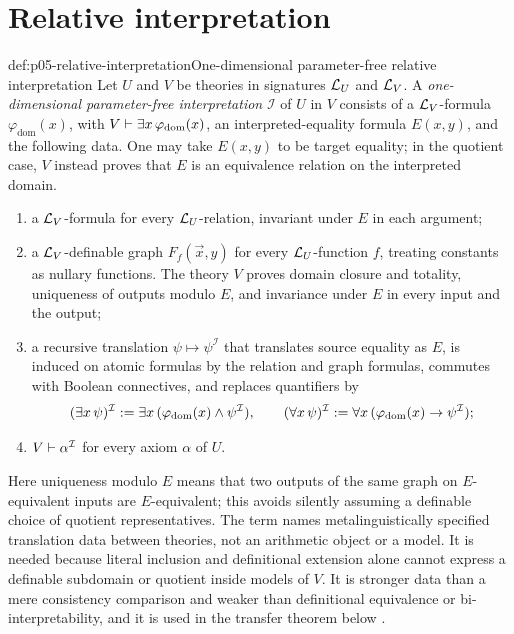 \section{Relative interpretation}

\begin{hbdefinition}{def:p05-relative-interpretation}{One-dimensional parameter-free relative interpretation}
Let \(U\) and \(V\) be theories in signatures \(\mathcal{L}_U\) and
\(\mathcal{L}_V\).  A \emph{one-dimensional parameter-free interpretation}
\(\mathcal I\) of \(U\) in \(V\) consists of a \(\mathcal{L}_V\)-formula
\(\varphi_{\mathrm{dom}}(x)\), with
\(V\vdash\exists x\,\varphi_{\mathrm{dom}}(x)\), an interpreted-equality
formula \(E(x,y)\), and the following data.  One may take \(E(x,y)\) to be
target equality; in the quotient case, \(V\) instead proves that \(E\) is
an equivalence relation on the interpreted domain.
\begin{enumerate}
  \item a \(\mathcal{L}_V\)-formula for every \(\mathcal{L}_U\)-relation, invariant
        under \(E\) in each argument;
  \item a \(\mathcal{L}_V\)-definable graph \(F_f(\vec x,y)\) for every
        \(\mathcal{L}_U\)-function \(f\), treating constants as nullary
        functions.  The theory \(V\) proves domain closure and totality,
        uniqueness of outputs modulo \(E\), and invariance under \(E\) in
        every input and the output;
  \item a recursive translation \(\psi\mapsto\psi^{\mathcal I}\) that
        translates source equality as \(E\), is induced on atomic formulas
        by the relation and graph formulas, commutes with Boolean
        connectives, and replaces quantifiers by
        \[
          (\exists x\,\psi)^{\mathcal I}\mathrel{:=}
          \exists x\,(\varphi_{\mathrm{dom}}(x)\land\psi^{\mathcal I}),
          \qquad
          (\forall x\,\psi)^{\mathcal I}\mathrel{:=}
          \forall x\,(\varphi_{\mathrm{dom}}(x)\to\psi^{\mathcal I});
        \]
  \item \(V\vdash\alpha^{\mathcal I}\) for every axiom
        \(\alpha\) of \(U\).
\end{enumerate}
Here uniqueness modulo \(E\) means that two outputs of the same graph on
\(E\)-equivalent inputs are \(E\)-equivalent; this avoids silently assuming
a definable choice of quotient representatives.  The term names
metalinguistically specified translation data between theories, not an
arithmetic object or a model.  It is needed because literal inclusion and
definitional extension alone cannot express a definable subdomain or
quotient inside models of \(V\).  It is stronger data than a mere
consistency comparison and weaker than definitional equivalence or
bi-interpretability, and it is used in the transfer theorem below
\cite{TMR1953,Lindstrom2003}.
\end{hbdefinition}

